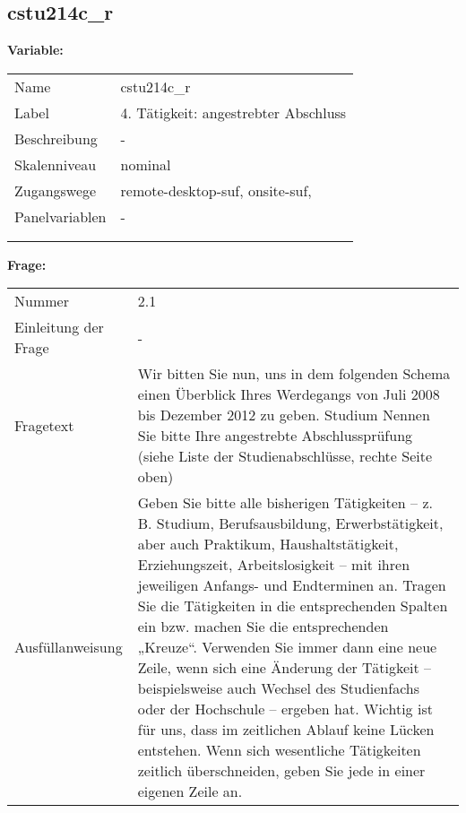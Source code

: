 	
	
	\subsection{cstu214c\_r}
	\label{subSection:cstu214c_r}

	\noindent\textbf{Variable:}\\
		\begin{tabular}{lL{11.3cm}}
			\label{tableVariable:cstu214c_r}
			Name & cstu214c\_r \\
			Label & 4. Tätigkeit: angestrebter Abschluss \\
			Beschreibung & - \\
			Skalenniveau & nominal \\
			Zugangswege &
				remote-desktop-suf,
				onsite-suf,
 \\
			Panelvariablen & -
			 \\
			 \\
 \\
		\end{tabular}

		\vspace*{1 cm}
		\noindent\textbf{Frage:}\\
		\begin{tabular}{lL{11.3cm}}
			\label{tableQuestion:cstu214c_r}
			Nummer & 2.1 \\
			Einleitung der Frage & - \\
			Fragetext & Wir bitten Sie nun, uns in dem folgenden Schema einen Überblick Ihres Werdegangs von Juli 2008 bis Dezember 2012 zu geben.
Studium
Nennen Sie bitte Ihre angestrebte Abschlussprüfung 
(siehe Liste der Studienabschlüsse, rechte Seite oben) \\
			Ausfüllanweisung & Geben Sie bitte alle bisherigen Tätigkeiten – z. B. Studium, Berufsausbildung, Erwerbstätigkeit, aber auch Praktikum, Haushaltstätigkeit,
Erziehungszeit, Arbeitslosigkeit – mit ihren jeweiligen Anfangs- und Endterminen an. Tragen Sie die Tätigkeiten in die entsprechenden Spalten ein bzw. machen Sie die entsprechenden „Kreuze“. Verwenden Sie immer dann eine neue Zeile, wenn sich eine Änderung der Tätigkeit – beispielsweise auch Wechsel des Studienfachs oder der Hochschule – ergeben hat. Wichtig ist für uns, dass im zeitlichen Ablauf keine Lücken entstehen. Wenn sich wesentliche Tätigkeiten zeitlich überschneiden, geben Sie jede in einer eigenen Zeile an. \\
		\end{tabular}





